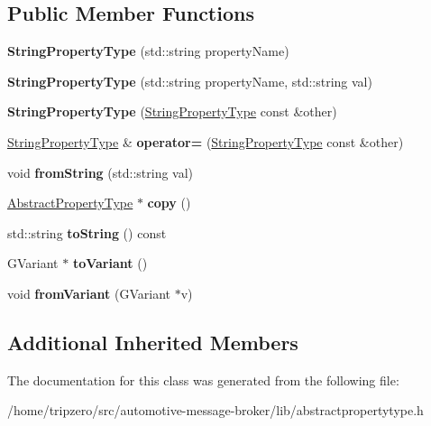 \subsection*{Public Member Functions}
\begin{DoxyCompactItemize}
\item 
\hypertarget{classStringPropertyType_ac9474db13442001b615cb29b889844eb}{{\bfseries String\-Property\-Type} (std\-::string property\-Name)}\label{classStringPropertyType_ac9474db13442001b615cb29b889844eb}

\item 
\hypertarget{classStringPropertyType_a071f749092ee76790fb508f0ea8c974a}{{\bfseries String\-Property\-Type} (std\-::string property\-Name, std\-::string val)}\label{classStringPropertyType_a071f749092ee76790fb508f0ea8c974a}

\item 
\hypertarget{classStringPropertyType_a221e152eec4bfa2bab6e063dd7eb2108}{{\bfseries String\-Property\-Type} (\hyperlink{classStringPropertyType}{String\-Property\-Type} const \&other)}\label{classStringPropertyType_a221e152eec4bfa2bab6e063dd7eb2108}

\item 
\hypertarget{classStringPropertyType_a2eb25280c4494ff5f9aca137bf5040c7}{\hyperlink{classStringPropertyType}{String\-Property\-Type} \& {\bfseries operator=} (\hyperlink{classStringPropertyType}{String\-Property\-Type} const \&other)}\label{classStringPropertyType_a2eb25280c4494ff5f9aca137bf5040c7}

\item 
\hypertarget{classStringPropertyType_ad9dd60fcfd9fd3ebaa578815c8d552fe}{void {\bfseries from\-String} (std\-::string val)}\label{classStringPropertyType_ad9dd60fcfd9fd3ebaa578815c8d552fe}

\item 
\hypertarget{classStringPropertyType_a15866eb8e3ee9e1be587740f64353d57}{\hyperlink{classAbstractPropertyType}{Abstract\-Property\-Type} $\ast$ {\bfseries copy} ()}\label{classStringPropertyType_a15866eb8e3ee9e1be587740f64353d57}

\item 
\hypertarget{classStringPropertyType_afb461a0a918e23e66880d0c8d2180b35}{std\-::string {\bfseries to\-String} () const }\label{classStringPropertyType_afb461a0a918e23e66880d0c8d2180b35}

\item 
\hypertarget{classStringPropertyType_a1ec1ba3797194880a1e7576bd3695a28}{G\-Variant $\ast$ {\bfseries to\-Variant} ()}\label{classStringPropertyType_a1ec1ba3797194880a1e7576bd3695a28}

\item 
\hypertarget{classStringPropertyType_ad4a1e7db1f6b381ab956eb70afd1509e}{void {\bfseries from\-Variant} (G\-Variant $\ast$v)}\label{classStringPropertyType_ad4a1e7db1f6b381ab956eb70afd1509e}

\end{DoxyCompactItemize}
\subsection*{Additional Inherited Members}


The documentation for this class was generated from the following file\-:\begin{DoxyCompactItemize}
\item 
/home/tripzero/src/automotive-\/message-\/broker/lib/abstractpropertytype.\-h\end{DoxyCompactItemize}
